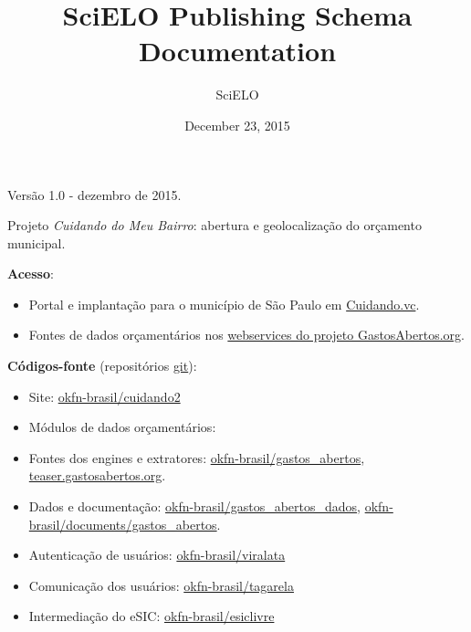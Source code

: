 \documentclass[letterpaper,10pt,english]{sphinxmanual}
\title{SciELO Publishing Schema Documentation}
\date{December 23, 2015}
\author{SciELO}
\begin{document}
\maketitle
\tableofcontents
{}\label{index::doc}


Versão 1.0 - dezembro de 2015.

Projeto \emph{Cuidando do Meu Bairro}: abertura e geolocalização do orçamento municipal.

\textbf{Acesso}:
\begin{itemize}
\item {} 
Portal e implantação para o município de São Paulo em  \href{http://cuidando.vc}{Cuidando.vc}.

\item {} 
Fontes de dados orçamentários nos \href{http://demo.gastosabertos.org}{webservices do projeto GastosAbertos.org}.

\end{itemize}

\textbf{Códigos-fonte} (repositórios \href{https://pt.wikipedia.org/wiki/Git}{git}):
\begin{itemize}
\item {} 
Site:
\href{https://github.com/okfn-brasil/cuidando2}{okfn-brasil/cuidando2}

\item {} 
Módulos de dados orçamentários:

\item {} 
Fontes dos engines e extratores:
\href{https://github.com/okfn-brasil/gastos\_abertos}{okfn-brasil/gastos\_abertos},
\href{https://github.com/okfn-brasil/teaser.gastosabertos.org}{teaser.gastosabertos.org}.

\item {} 
Dados e documentação:
\href{https://github.com/okfn-brasil/gastos\_abertos\_dados}{okfn-brasil/gastos\_abertos\_dados},
\href{https://github.com/okfn-brasil/documents/blob/master/gastos\_abertos}{okfn-brasil/documents/gastos\_abertos}.

\item {} 
Autenticação de usuários:
\href{https://github.com/okfn-brasil/viralata}{okfn-brasil/viralata}

\item {} 
Comunicação dos usuários:
\href{https://github.com/okfn-brasil/tagarela}{okfn-brasil/tagarela}

\item {} 
Intermediação do eSIC:
\href{https://github.com/okfn-brasil/esiclivre}{okfn-brasil/esiclivre}

\end{itemize}
\end{document}
